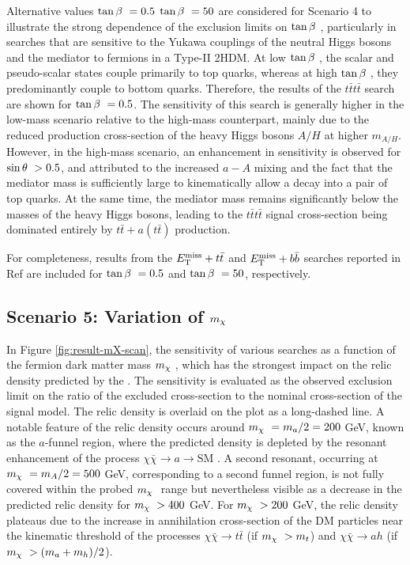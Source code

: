 Alternative values $\tan\beta~=0.5$ $\tan\beta~=50$ are considered for Scenario 4 to illustrate the strong dependence of the exclusion limits on $\tan\beta~$, particularly in searches that are sensitive to the Yukawa couplings of the neutral Higgs bosons and the mediator to fermions in a Type-II 2HDM. At low $\tan\beta~$, the scalar and pseudo-scalar states couple primarily to top quarks, whereas at high $\tan\beta~$, they predominantly couple to bottom quarks. Therefore, the results of the $t\bar{t}t\bar{t}$ search are shown for $\tan\beta~=0.5$. The sensitivity of this search is generally higher in the low-mass scenario relative to the high-mass counterpart, mainly due to the reduced production cross-section of the heavy Higgs bosons $A/H$ at higher $m_{A/H}$. However, in the high-mass scenario, an enhancement in sensitivity is observed for $\sin\theta~ > 0.5$, and attributed to the increased $a-A$ mixing and the fact that the mediator mass is sufficiently large to kinematically allow a decay into a pair of top quarks. At the same time, the mediator mass remains significantly below the masses of the heavy Higgs bosons, leading to the $t\bar{t}t\bar{t}$ signal cross-section being dominated entirely by $t\bar{t} + a (t\bar{t})$ production. 

For completeness, results from the $E_{\mathrm{T}}^{\mathrm{miss}}+t\bar{t}$ and $E_{\mathrm{T}}^{\mathrm{miss}}+b\bar{b}$ searches reported in Ref \cite{EXOT-2017-32} are included for $\tan\beta~=0.5$ and $\tan\beta~=50$, respectively.

\subsection{Scenario 5: Variation of \texorpdfstring{$m_{\chi}~$}{TEXT}}

In Figure \ref{fig:result-mX-scan}, the sensitivity of various searches as a function of the fermion dark matter mass $m_{\chi}~$, which has the strongest impact on the relic density predicted by the \hdma. The sensitivity is evaluated as the observed exclusion limit on the ratio of the excluded cross-section to the nominal cross-section of the signal model. The relic density is overlaid on the plot as a long-dashed line. A notable feature of the relic density occurs around $m_{\chi}~=m_a/2=200$ GeV, known as the $a$-funnel region, where the predicted density is depleted by the resonant enhancement of the process $\chi\bar{\chi}\rightarrow a\rightarrow \mathrm{SM}$ \cite{Djouadi:2005dz,Bagnaschi:2015eha,2HDMWGproxi}. A second resonant, occurring at $m_{\chi}~=m_A/2=500$ GeV, corresponding to a second funnel region, is not fully covered within the probed $m_{\chi}~$ range but nevertheless visible as a decrease in the predicted relic density for $m_{\chi}~ >400$ GeV. For $m_{\chi}~ >200$ GeV, the relic density plateaus due to the increase in annihilation cross-section of the DM particles near the kinematic threshold of the processes $\chi\bar{\chi}\rightarrow t\bar{t}$ (if $m_{\chi}~ > m_t$) and $\chi\bar{\chi}\rightarrow ah$ (if $m_{\chi}~ > (m_a+m_h)/2$). 


